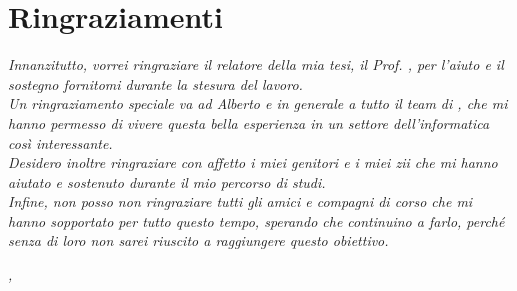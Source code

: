 
\cleardoublepage
{}
{}




\begingroup
\let\clearpage\relax
\let\cleardoublepage\relax
\let\cleardoublepage\relax

\chapter*{Ringraziamenti}

\noindent \textit{Innanzitutto, vorrei ringraziare il relatore della mia tesi, il Prof. \myProf, per l'aiuto e il sostegno fornitomi durante la stesura del lavoro.}\\

\noindent \textit{Un ringraziamento speciale va ad Alberto e in generale a tutto il team di \myCompany , che mi hanno permesso di vivere questa bella esperienza in un settore dell'informatica così interessante.}\\

\noindent \textit{Desidero inoltre ringraziare con affetto i miei genitori e i miei zii che mi hanno aiutato e sostenuto durante il mio percorso di studi.}\\

\noindent \textit{Infine, non posso non ringraziare tutti gli amici e compagni di corso che mi hanno sopportato per tutto questo tempo, sperando che continuino a farlo, perché senza di loro non sarei riuscito a raggiungere questo obiettivo.}\\

\bigskip

\noindent\textit{\myLocation, \myTime}
\hfill \myName

\endgroup

